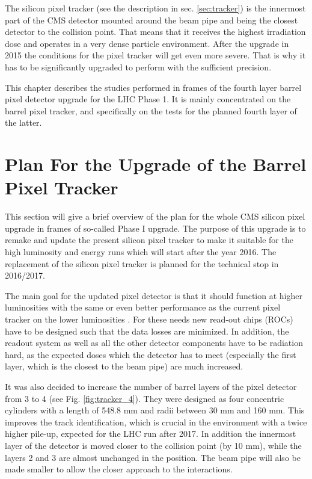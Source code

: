 The silicon pixel tracker (see the description in sec. \ref{sec:tracker}) is the innermost part of the CMS 
detector mounted around the beam pipe and being the closest detector to the collision point. That means that
it receives the highest irradiation dose and operates in a very dense particle environment. After the upgrade 
in 2015 the conditions for the pixel tracker will get even more severe. That is why it has to be significantly 
upgraded to perform with the sufficient precision. 

This chapter describes the studies performed in frames of the fourth layer barrel pixel detector upgrade for the
LHC Phase 1. It is mainly concentrated on the barrel pixel tracker, and specifically on the tests for the
planned fourth layer of the latter.

\section{Plan For the Upgrade of the Barrel Pixel Tracker}

This section will give a brief overview of the plan for the whole CMS silicon pixel upgrade in frames of so-called
Phase I upgrade. The purpose of this upgrade is to remake and update the present silicon pixel tracker to make it 
suitable for the high luminosity and energy runs which will start after the year 2016. The replacement of the silicon
pixel tracker is planned for the technical stop in 2016/2017. 

The main goal for the updated pixel detector is that it should function at higher luminosities with the same or even
better performance as the current pixel tracker on the lower luminosities \cite{CMS:2012sda}. For these needs new read-out chips
(ROCs) have to be designed such that the data losses are minimized. In addition, the readout system as well as all
the other detector components have to be radiation hard, as the expected doses which the detector has to meet (especially
the first layer, which is the closest to the beam pipe) are much increased.

It was also decided to increase the number of barrel layers of the pixel detector from 3 to 4 (see Fig. \ref{fig:tracker_4}).
They were designed as four concentric cylinders with a length of 548.8 mm and radii between 30 mm and 160 mm.
This improves the track identification, which is crucial in the environment with a twice higher pile-up, expected for the 
LHC run after 2017. In addition the innermost layer of the detector is moved closer to the collision point (by 10 mm), while
the layers 2 and 3 are almost unchanged in the position. The beam pipe
will also be made smaller to allow the closer approach to the interactions.

